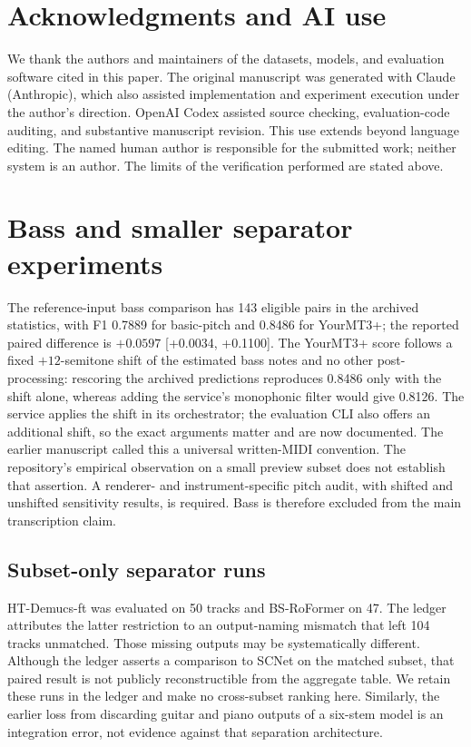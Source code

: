\documentclass[11pt]{article}
\newcommand{\ci}[2]{{\small[#1, #2]}}
\begin{document}
\section*{Acknowledgments and AI use}
We thank the authors and maintainers of the datasets, models, and evaluation
software cited in this paper. The original manuscript was generated with Claude
(Anthropic), which also assisted implementation and experiment execution under the
author's direction. OpenAI Codex assisted source checking, evaluation-code auditing,
and substantive manuscript revision. This use extends beyond language editing.
The named human author is responsible for the submitted work; neither system is
an author. The limits of the verification performed are stated above.

\appendix
\section{Bass and smaller separator experiments}
\label{app:bass}
The reference-input bass comparison has 143 eligible pairs in the archived
statistics, with F1 0.7889 for basic-pitch and 0.8486 for YourMT3+; the reported
paired difference is $+0.0597$ \ci{+0.0034}{+0.1100}. The YourMT3+ score follows
a fixed $+12$-semitone shift of the estimated bass notes and no other
post-processing: rescoring the archived predictions reproduces 0.8486 only with the
shift alone, whereas adding the service's monophonic filter would give 0.8126. The
service applies the shift in its orchestrator; the evaluation CLI also offers an
additional shift, so the exact arguments matter and are now documented.
The earlier manuscript called this a universal written-MIDI convention. The
repository's empirical observation on a small preview subset does not establish
that assertion. A renderer- and instrument-specific pitch audit, with shifted and
unshifted sensitivity results, is required. Bass is therefore excluded from the
main transcription claim.

\subsection{Subset-only separator runs}
\label{app:subsets}
HT-Demucs-ft was evaluated on 50 tracks and BS-RoFormer on 47. The ledger
attributes the latter restriction to an output-naming mismatch that left 104
tracks unmatched. Those missing outputs may be systematically different. Although
the ledger asserts a comparison to SCNet on the matched subset, that paired
result is not publicly reconstructible from the aggregate table. We retain these
runs in the ledger and make no cross-subset ranking here. Similarly, the earlier
loss from discarding guitar and piano outputs of a six-stem model is an integration
error, not evidence against that separation architecture.
\end{document}
